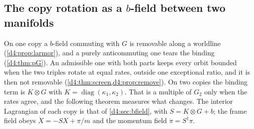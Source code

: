 \subsection{\texorpdfstring{The copy rotation as a $b$-field between two manifolds}{The copy rotation as a b-field between two manifolds}}
\label{d5:sec:bfield}

On one copy a $b$-field commuting with $G$ is removable along a worldline (\cref{d4:prop:larmor}), and a purely anticommuting one tears
the binding (\cref{d4:thm:pG}). An admissible one with both parts keeps every orbit bounded when the two triples rotate at equal rates,
outside one exceptional ratio, and it is then not removable (\cref{d4:thm:screen,d4:prop:remove}). On two copies the binding term is $K\otimes G$ with $K=\operatorname{diag}(\kappa_1,\kappa_2)$. That is a
multiple of $G_2$ only when the rates agree, and the following theorem measures what changes. The interior Lagrangian of each copy is that
of \cref{d4:sec:bfield}, with $S=K\otimes G+b$; the frame field obeys $\dot X=-SX+\pi/m$ and the momentum field $\dot\pi=S^\dagger\pi$.

